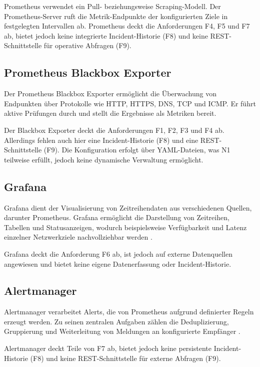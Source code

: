 Prometheus verwendet ein Pull- beziehungsweise Scraping-Modell. Der Prometheus-Server ruft die Metrik-Endpunkte der konfigurierten Ziele in festgelegten Intervallen ab. Prometheus deckt die Anforderungen F4, F5 und F7 ab, bietet jedoch keine integrierte Incident-Historie (F8) und keine REST-Schnittstelle für operative Abfragen (F9).

\subsection{Prometheus Blackbox Exporter}
\label{subsec:blackbox-exporter}

Der Prometheus Blackbox Exporter ermöglicht die Überwachung von Endpunkten über Protokolle wie HTTP, HTTPS, DNS, TCP und ICMP. Er führt aktive Prüfungen durch und stellt die Ergebnisse als Metriken bereit.

Der Blackbox Exporter deckt die Anforderungen F1, F2, F3 und F4 ab. Allerdings fehlen auch hier eine Incident-Historie (F8) und eine REST-Schnittstelle (F9). Die Konfiguration erfolgt über YAML-Dateien, was N1 teilweise erfüllt, jedoch keine dynamische Verwaltung ermöglicht.

\subsection{Grafana}
\label{subsec:grafana}

Grafana dient der Visualisierung von Zeitreihendaten aus verschiedenen Quellen, darunter Prometheus. Grafana ermöglicht die Darstellung von Zeitreihen, Tabellen und Statusanzeigen, wodurch beispielsweise Verfügbarkeit und Latenz einzelner Netzwerkziele nachvollziehbar werden \cite{grafanaprometheus-datasource}.

Grafana deckt die Anforderung F6 ab, ist jedoch auf externe Datenquellen angewiesen und bietet keine eigene Datenerfassung oder Incident-Historie.

\subsection{Alertmanager}
\label{subsec:alertmanager}

Alertmanager verarbeitet Alerts, die von Prometheus aufgrund definierter Regeln erzeugt werden. Zu seinen zentralen Aufgaben zählen die Deduplizierung, Gruppierung und Weiterleitung von Meldungen an konfigurierte Empfänger \cite{prometheusalertmanager}.

Alertmanager deckt Teile von F7 ab, bietet jedoch keine persistente Incident-Historie (F8) und keine REST-Schnittstelle für externe Abfragen (F9).

